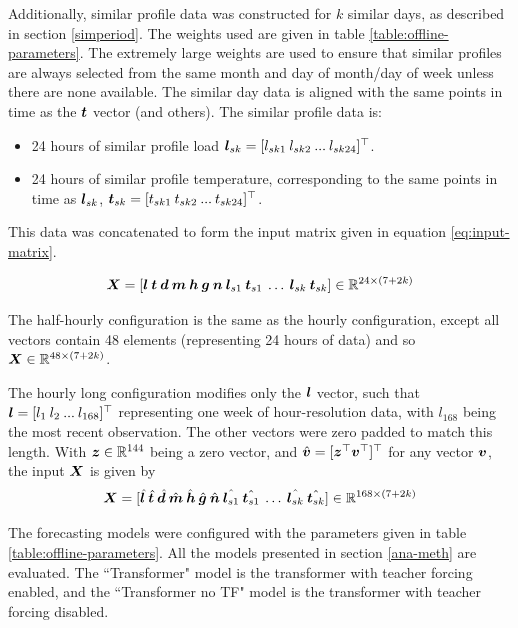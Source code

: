 Additionally, similar profile data was constructed for $k$ similar days, as described in section \ref{simperiod}.
The weights used are given in table \ref{table:offline-parameters}.
The extremely large weights are used to ensure that similar profiles are always selected from the same month and day of month/day of week unless there are none available.
The similar day data is aligned with the same points in time as the ${\bm{t}}$ vector (and others).
The similar profile data is:

\begin{itemize}
	\item 24 hours of similar profile load ${\bm{l}}_{sk} = [ l_{sk1} \: l_{sk2} \: ... \: l_{sk24}]^\top$.
	\item 24 hours of similar profile temperature, corresponding to the same points in time as ${\bm{l}}_{sk}$, ${\bm{t}}_{sk} = [ t_{sk1} \: t_{sk2} \: ...  \: t_{sk24}]^\top$.
\end{itemize}

This data was concatenated to form the input matrix given in equation \ref{eq:input-matrix}.

\begin{equation} \label{eq:input-matrix}
{\bm{X}} = [ {\bm{l}} \: {\bm{t}} \: {\bm{d}} \: {\bm{m}} \: {\bm{h}} \: {\bm{g}} \: {\bm{n}} \: {\bm{l}}_{s1} \: {\bm{t}}_{s1} \: \ldots \: {\bm{l}}_{sk} \: {\bm{t}}_{sk}] \in \mathbb{R}^{24 \times (7 + 2k)}
\end{equation}

The half-hourly configuration is the same as the hourly configuration, except all vectors contain 48 elements (representing 24 hours of data) and so ${\bm{X}} \in \mathbb{R}^{48 \times (7 + 2k)}$.

The hourly long configuration modifies only the ${\bm{l}}$ vector, such that ${\bm{l}} = [ l_1 \: l_2 \: ...  \: l_{168}]^\top$ representing one week of hour-resolution data, with $l_{168}$ being the most recent observation.
The other vectors were zero padded to match this length.
With ${\bm{z}} \in \mathbb{R}^{144}$ being a zero vector, and $\hat{{\bm{v}}} = [{\bm{z}}^\top {\bm{v}}^\top]^\top$ for any vector ${\bm{v}}$, the input ${\bm{X}}$ is given by
\begin{equation}
{\bm{X}} = [ \hat{{\bm{l}}} \: \hat{{\bm{t}}} \: \hat{{\bm{d}}} \: \hat{{\bm{m}}} \: \hat{{\bm{h}}} \: \hat{{\bm{g}}} \: \hat{{\bm{n}}} \: \hat{{\bm{l}}_{s1}} \: \hat{{\bm{t}}_{s1}} \: \ldots \: \hat{{\bm{l}}_{sk}} \: \hat{{\bm{t}}_{sk}}] \in \mathbb{R}^{168 \times (7 + 2k)}
\end{equation}

The forecasting models were configured with the parameters given in table \ref{table:offline-parameters}.
All the models presented in section \ref{ana-meth} are evaluated.
The ``Transformer" model is the transformer with teacher forcing enabled, and the ``Transformer no TF" model is the transformer with teacher forcing disabled.

